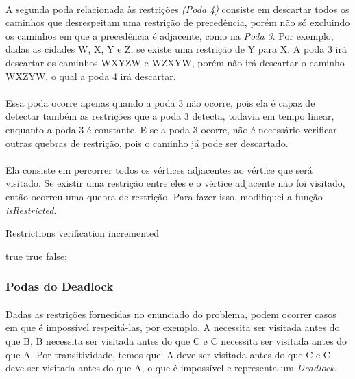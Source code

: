 \documentclass[a4paper, 12pt]{article}
\begin{document}
\paragraph{}
A segunda poda relacionada às restrições \textit{(Poda 4)} consiste em descartar todos os caminhos que desrespeitam uma restrição de precedência, porém não só excluindo os caminhos em que a precedência é adjacente, como na \textit{Poda 3}. Por exemplo, dadas as cidades W, X, Y e Z, se existe uma restrição de Y para X. A poda 3 irá descartar os caminhos WXYZW e WZXYW, porém não irá descartar o caminho WXZYW, o qual a poda 4 irá descartar.
\paragraph{}
Essa poda ocorre apenas quando a poda 3 não ocorre, pois ela é capaz de detectar também as restrições que a poda 3 detecta, todavia em tempo linear, enquanto a poda 3 é constante. E se a poda 3 ocorre, não é necessário verificar outras quebras de restrição, pois o caminho já pode ser descartado.
\paragraph{}
Ela consiste em percorrer todos os vértices adjacentes ao vértice que será visitado. Se existir uma restrição entre eles e o vértice adjacente não foi visitado, então ocorreu uma quebra de restrição. Para fazer isso, modifiquei a função \textit{isRestricted}.

\begin{algorithm}
\caption{Restrictions verification incremented}
\begin{algorithmic}

    
	\State \Return true
\Else
			\State \Return true
		\EndIf
    \EndFor
\EndIf
\State \Return false;			
	
\EndFunction
\end{algorithmic}
\end{algorithm}

\subsubsection{Podas do Deadlock}
\paragraph{}
Dadas as restrições fornecidas no enunciado do problema, podem ocorrer casos em que é impossível respeitá-las, por exemplo. A necessita ser visitada antes do que B, B necessita ser visitada antes do que C e C necessita ser visitada antes do que A. Por transitividade, temos que: A deve ser visitada antes do que C e C deve ser visitada antes do que A, o que é impossível e representa um \textit{Deadlock}.
\end{document}
